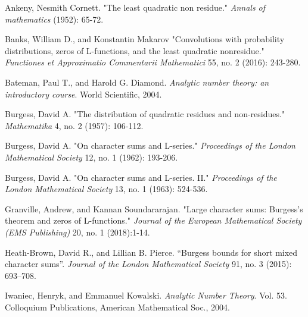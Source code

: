 \documentclass[letter,12pt]{article}
\theoremstyle{plain}
\theoremstyle{definition}
\theoremstyle{plain}
\begin{document}

\begin{thebibliography}{}
\footnotesize

 Ankeny, Nesmith Cornett. "The least quadratic non residue." \textit{Annals of mathematics} (1952): 65-72.

 Banks, William D., and Konstantin Makarov "Convolutions with probability distributions, zeros of L-functions, and the least quadratic nonresidue." \textit{Functiones et Approximatio Commentarii Mathematici} 55, no. 2 (2016): 243-280.

 Bateman, Paul T., and Harold G. Diamond. \textit{Analytic number theory: an introductory course}. World Scientific, 2004.

 Burgess, David A. "The distribution of quadratic residues and non-residues." \textit{Mathematika} 4, no. 2 (1957): 106-112.

 Burgess, David A. "On character sums and L‐series." \textit{Proceedings of the London Mathematical Society} 12, no. 1 (1962): 193-206.

 Burgess, David A. "On character sums and L-series. II." \textit{Proceedings of the London Mathematical Society} 13, no. 1 (1963): 524-536.

 Granville, Andrew, and Kannan Soundararajan. "Large character sums: Burgess's theorem and zeros of L-functions." \textit{Journal of the European Mathematical Society (EMS Publishing)} 20, no. 1 (2018):1-14.

 Heath-Brown, David R., and Lillian B. Pierce.  ``Burgess bounds for short mixed character sums''. \textit{Journal of the London Mathematical Society} 91, no. 3 (2015): 693–708.

 Iwaniec, Henryk, and Emmanuel Kowalski. \textit{Analytic Number Theory}. Vol. 53. Colloquium Publications, American Mathematical Soc., 2004.


\end{thebibliography}
\end{document}
